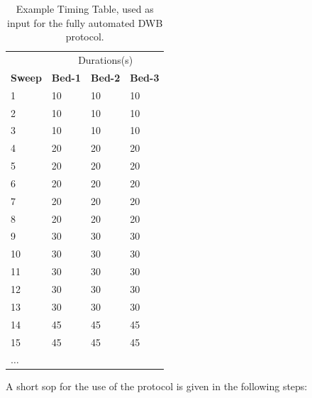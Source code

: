 \begin{table}[ht!]
\centering
\label{tab:TimmingTable}
\caption{Example Timing Table, used as input for the fully automated DWB protocol.}
\begin{tabular}{|l|l|l|l|}
\toprule
\textbf{} & \multicolumn{3}{c|}{Durations(s)} \\ 
\textbf{Sweep} & \textbf{Bed-1} & \textbf{Bed-2} & \textbf{Bed-3} \\
\midrule
1     & 10    & 10   & 10    \\
2     & 10    & 10                        & 10    \\
3     & 10    & 10                        & 10    \\
4     & 20    & 20                        & 20    \\
5     & 20    & 20                        & 20    \\
6     & 20    & 20                        & 20    \\
7     & 20    & 20                        & 20    \\
8     & 20    & 20                        & 20    \\
9     & 30    & 30                        & 30    \\
10    & 30    & 30                        & 30    \\
11    & 30    & 30                        & 30    \\
12    & 30    & 30                        & 30    \\
13    & 30    & 30                        & 30    \\
14    & 45    & 45                        & 45    \\
15    & 45    & 45                        & 45    \\
\multicolumn{4}{|l|}{$\dots$} \\
\bottomrule
\end{tabular}
\end{table}

A short \gls{sop} for the use of the protocol is given in the following steps:

